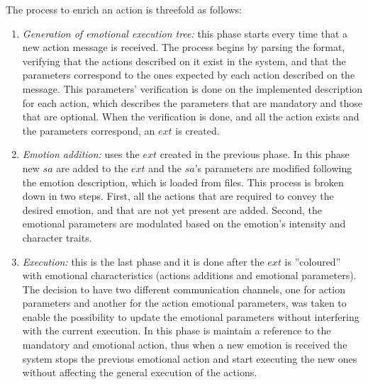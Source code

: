 The process to enrich an action is threefold as follows:
\begin{enumerate}

	\item \textit{Generation of emotional execution tree:} this phase starts every time that a new action message is received. The process begins by parsing the format, verifying that the actions described on it exist in the system, and that the parameters correspond to the ones expected by each action described on the message. This parameters' verification is done on the implemented description for each action, which describes the parameters that are mandatory and those that are optional. When the verification is done, and all the action exists and  the parameters correspond, an $ext$ is created.

	\item \textit{Emotion addition:} uses the $ext$ created in the previous phase. In this phase new $sa$ are added to the $ext$ and the $sa$'s parameters are modified following the emotion description, which is loaded from files. This process is broken down in two steps. First, all the actions that are required to convey the desired emotion, and that are not yet present are added. Second, the emotional parameters are modulated based on the emotion's intensity and character traits.

	\item \textit{Execution:} this is the last phase and it is done after the $ext$ is ''coloured'' with emotional characteristics (actions additions and emotional parameters). The decision to have two different communication channels, one for action parameters and another for the action emotional parameters, was taken to enable the possibility to update the emotional parameters without interfering with the current execution. In this phase is maintain a reference to the mandatory and emotional action, thus when a new emotion is received the system stops the previous emotional action and start executing the new ones without affecting the general execution of the actions.

\end{enumerate}